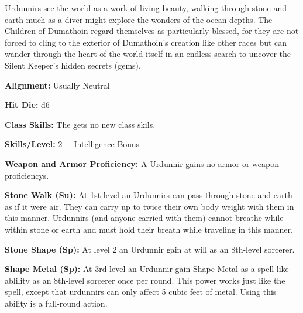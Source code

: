 
Urdunnirs see the world as a work of living beauty, walking through stone and earth much as a diver might explore the wonders of the ocean depths. The Children of Dumathoin regard themselves as particularly blessed, for they are not forced to cling to the exterior of Dumathoin’s creation like other races but can wander through the heart of the world itself in an endless search to uncover the Silent Keeper’s hidden secrets (gems).

\textbf{Alignment:} Usually Neutral

\textbf{Hit Die:} d6

\textbf{Class Skills:} The \currentclassname{} gets no new class skils.

\textbf{Skills/Level:} 2 + Intelligence Bonus

\modebab{}
\poorfor{}
\poorref{}
\goodwil{}

\begin{classtable}
\end{classtable}

\classfeatures

\textbf{Weapon and Armor Proficiency:} A Urdunnir gains no armor or weapon proficiencys.

\textbf{Stone Walk (Su):} At 1st level an Urdunnirs can pass through stone and earth as if it were air. They can carry up to twice their own body weight with them in this manner. Urdunnirs (and anyone carried with them) cannot breathe while within stone or earth and must hold their breath while traveling in this manner.

\textbf{Stone Shape (Sp):} At level 2 an Urdunnir gain  at will as an 8th-level sorcerer.

\textbf{Shape Metal (Sp):} At 3rd level an Urdunnir gain Shape Metal as a spell-like ablility as an 8th-level sorcerer once per round. This power works just like the  spell, except that urdunnirs can only affect 5 cubic feet of metal. Using this ability is a full-round action.
